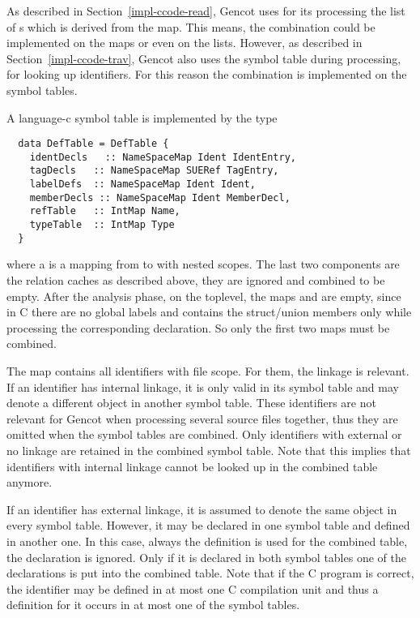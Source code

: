 As described in Section~\ref{impl-ccode-read}, Gencot uses for its processing the list of s which is
derived from the  map. This means, the combination could be implemented on the 
maps or even on the  lists. However, as described in Section~\ref{impl-ccode-trav}, Gencot also
uses the symbol table during processing, for looking up identifiers. For this reason the combination is implemented
on the symbol tables.

A language-c symbol table is implemented by the type 
\begin{verbatim}
  data DefTable = DefTable {
    identDecls   :: NameSpaceMap Ident IdentEntry,
    tagDecls   :: NameSpaceMap SUERef TagEntry,
    labelDefs  :: NameSpaceMap Ident Ident,
    memberDecls :: NameSpaceMap Ident MemberDecl,
    refTable   :: IntMap Name,
    typeTable  :: IntMap Type
  }
\end{verbatim}
where a  is a mapping from  to  with nested scopes. The last two components are the 
relation caches as described above, they are ignored and combined to be empty. After the analysis phase, on the toplevel, 
the maps  and  are empty, since in C there are no global labels and 
contains the struct/union members only while processing the corresponding declaration. So only the first two maps must
be combined.

The map  contains all identifiers with file scope. For them, the linkage is relevant. If an identifier has 
internal linkage, it is only valid in its symbol table and may denote a different object in another symbol table. These
identifiers are not relevant for Gencot when processing several source files together, thus they are omitted when the
symbol tables are combined. Only identifiers with external or no linkage are retained in the combined symbol table. Note
that this implies that identifiers with internal linkage cannot be looked up in the combined table anymore.

If an identifier has external linkage, it is assumed to denote the same object in every symbol table. However, it may be
declared in one symbol table and defined in another one. In this case, always the definition is used for the combined
table, the declaration is ignored. Only if it is declared in both symbol tables one of the declarations is put into the
combined table. Note that if the C program is correct, the identifier may be defined in at most one C compilation unit
and thus a definition for it occurs in at most one of the symbol tables. 

